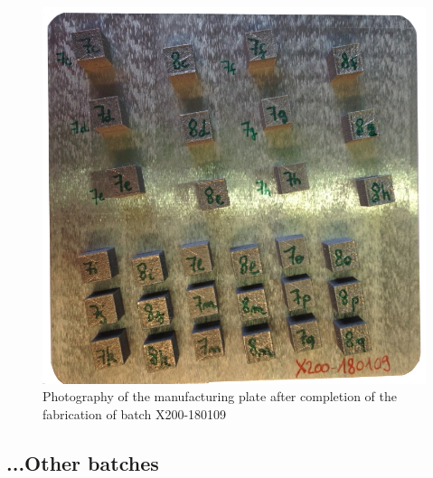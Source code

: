 \begin{figure}[ht]
\centering
\includegraphics[scale=0.45]{Images/180109-real}
\decoRule
\caption[Photography of the manufacturing plate after completion of the fabrication of batch X200-180109]{Photography of the manufacturing plate after completion of the fabrication of batch X200-180109}
\label{fig:180109-real}
\end{figure}

\subsection{...Other batches}